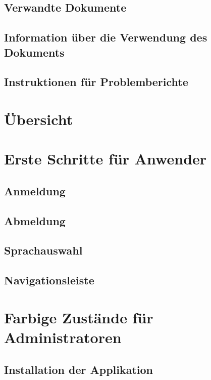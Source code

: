 \documentclass[enabledeprecatedfontcommands,fontsize=12pt,paper=a4,twoside]{scrartcl}
\begin{document}
\subsection{Verwandte Dokumente}
\subsection{Information über die Verwendung des Dokuments}
\subsection{Instruktionen für Problemberichte}


\newpage
\section{Übersicht}


\newpage
\section{Erste Schritte für Anwender}
\subsection{Anmeldung}
\subsection{Abmeldung}
\subsection{Sprachauswahl}
\subsection{Navigationsleiste}


\newpage
\section{Farbige Zustände für Administratoren}
\subsection{Installation der Applikation}
\end{document}
